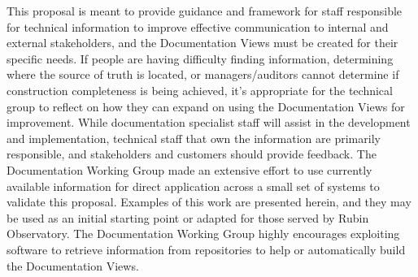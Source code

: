 This proposal is meant to provide guidance and framework for staff responsible for technical information to improve effective communication to internal and external stakeholders, and the Documentation Views must be created for their specific needs.
If people are having difficulty finding information, determining where the source of truth is located, or managers/auditors cannot determine if construction completeness is being achieved, it's appropriate for the technical group to reflect on how they can expand on using the Documentation Views for improvement.
While documentation specialist staff will assist in the development and implementation, technical staff that own the information are primarily responsible, and stakeholders and customers should provide feedback.
The Documentation Working Group made an extensive effort to use currently available information for direct application across a small set of systems to validate this proposal.
Examples of this work are presented herein, and they may be used as an initial starting point or adapted for those served by Rubin Observatory.
The Documentation Working Group highly encourages exploiting software to retrieve information from repositories to help or automatically build the Documentation Views.
